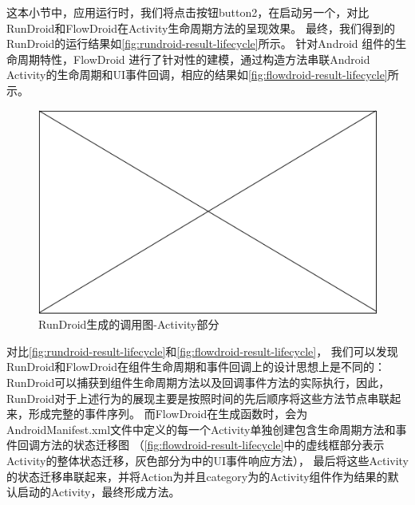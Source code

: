 这本小节中，应用运行时，我们将点击按钮button2，在启动另一个，对比RunDroid和FlowDroid在Activity生命周期方法的呈现效果。
最终，我们得到的RunDroid的运行结果如\autoref{fig:rundroid-result-lifecycle}所示。
针对Android 组件的生命周期特性，FlowDroid 进行了针对性的建模，通过构造方法串联Android Activity的生命周期和UI事件回调，相应的结果如\autoref{fig:flowdroid-result-lifecycle}所示。

\begin{figure}[ht]
	\centering
	\includegraphics[width=\textwidth]{./Figures/empty.png}
	\caption{RunDroid生成的调用图-Activity部分}
	\label{fig:rundroid-result-lifecycle}
\end{figure}

对比\autoref{fig:rundroid-result-lifecycle}和\autoref{fig:flowdroid-result-lifecycle}，
我们可以发现RunDroid和FlowDroid在组件生命周期和事件回调上的设计思想上是不同的：
RunDroid可以捕获到组件生命周期方法以及回调事件方法的实际执行，因此，RunDroid对于上述行为的展现主要是按照时间的先后顺序将这些方法节点串联起来，形成完整的事件序列。
而FlowDroid在生成函数时，会为AndroidManifest.xml文件中定义的每一个Activity单独创建包含生命周期方法和事件回调方法的状态迁移图
（\autoref{fig:flowdroid-result-lifecycle}中的虚线框部分表示Activity的整体状态迁移，灰色部分为中的UI事件响应方法），
最后将这些Activity的状态迁移串联起来，并将Action为并且category为的Activity组件作为结果的默认启动的Activity，最终形成方法。


